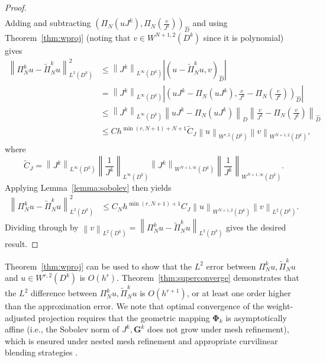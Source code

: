 \documentclass[preprint,10pt]{article}
\theoremstyle{definition}
\theoremstyle{lemma}
\theoremstyle{theorem}
\theoremstyle{assumption}
\renewcommand{\hat}{\widehat}
\renewcommand{\tilde}{\widetilde}
\newcommand{\nor}[1]{\left\| #1 \right\|}
\newcommand{\LRp}[1]{\left( #1 \right)}
\newcommand{\LRb}[1]{\left| #1 \right|}
\begin{document}
{\begin{proof}
\begin{align*}
\end{align*}
Adding and subtracting $\LRp{\Pi_N\LRp{uJ^k},\Pi_N\LRp{\frac{v}{J^k}}}_{\hat{D}}$ and using Theorem~\ref{thm:wproj} (noting that $v\in W^{N+1,2}\LRp{D^k}$ since it is polynomial) gives
\begin{align*}
\nor{\Pi^k_Nu-\tilde{\Pi}^k_Nu}_{L^2\LRp{D^k}}^2 &\leq \nor{J^k}_{L^{\infty}\LRp{D^k}}\LRb{\LRp{u-\tilde{\Pi}^k_Nu,v}_{\hat{D}}}\\
&= \nor{J^k}_{L^{\infty}\LRp{D^k}}\LRb{\LRp{uJ^k - \Pi_N\LRp{uJ^k},\frac{v}{J^k}-\Pi_N\LRp{\frac{v}{J^k}}}_{\hat{D}}} \\
&\leq \nor{J^k}_{L^{\infty}\LRp{D^k}}\nor{uJ^k - \Pi_N\LRp{uJ^k}}_{\hat{D}}\nor{\frac{v}{J^k}-\Pi_N\LRp{\frac{v}{J^k}}}_{\hat{D}}\\
&\leq C h^{\min\LRp{r,N+1}+N+1} \tilde{C}_J \nor{u}_{W^{r,2}\LRp{D^k}} \nor{v}_{W^{N+1,2}\LRp{D^k}},
\end{align*}
where 
\[
\tilde{C}_J = \nor{J^k}_{L^{\infty}\LRp{D^k}}\nor{\frac{1}{J^k}}_{L^{\infty}\LRp{D^k}} \nor{J^k}_{W^{N+1,\infty}\LRp{D^k}}\nor{\frac{1}{J^k}}_{W^{N+1,\infty}\LRp{D^k}}.
\]
Applying Lemma~\ref{lemma:sobolev} then yields
\begin{align*}
\nor{\Pi^k_Nu-\tilde{\Pi}^k_Nu}_{L^2\LRp{D^k}}^2 &\leq C_N h^{\min\LRp{r,N+1}+1} C_J \nor{u}_{W^{N+1,2}\LRp{D^k}} \nor{v}_{L^2\LRp{D^k}}.
\end{align*}
Dividing through by $\nor{v}_{L^2\LRp{D^k}} = \nor{\Pi^k_N u - \tilde{\Pi}^k_N  u}_{L^2\LRp{D^k}}$ gives the desired result.  %
\end{proof}
Theorem~\ref{thm:wproj} can be used to show that the $L^2$ error between $\Pi^k_N u, \tilde{\Pi}^k_N u$ and $u \in W^{r,2}\LRp{D^k}$ is $O(h^r)$.  Theorem~\ref{thm:superconverge} demonstrates that the $L^2$ difference between $\Pi^k_N u, \tilde{\Pi}^k_N u$ is $O(h^{r+1})$, or at least one order higher than the approximation error.  We note that optimal convergence of the weight-adjusted projection requires that the geometric mapping $\bm{\Phi}_k$ is asymptotically affine (i.e., the Sobolev norm of $J^k, \bm{G}^k$ does not grow under mesh refinement), which is ensured under nested mesh refinement and appropriate curvilinear blending strategies \cite{lenoir1986optimal, warburton2013low, chan2016weight2}.  

}
\end{document}
